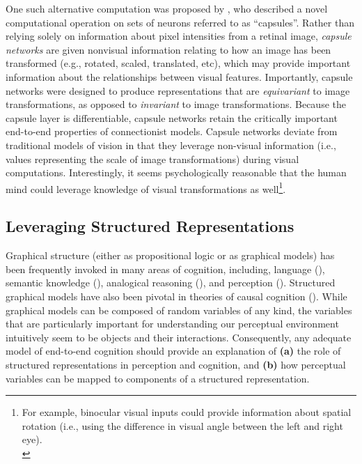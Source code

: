 \documentclass[12pt]{article}
\let\oldcite=\cite
\let\oldtextcite=\textcite
\renewcommand{\cite}[1]{\textcolor[rgb]{0, .121, .388}{\oldcite{#1}}}
\renewcommand{\textcite}[1]{\textcolor[rgb]{0, .121, .388}{\oldtextcite{#1}}}
\begin{document}
One such alternative computation was proposed by \textcite{hinton2011transforming}, who described a novel computational operation on sets of neurons referred to as ``capsules''. Rather than relying solely on information about pixel intensities from a retinal image, \emph{capsule networks} are given nonvisual information relating to how an image has been transformed (e.g., rotated, scaled, translated, etc), which may provide important information about the relationships between visual features. Importantly, capsule networks were designed to produce representations that are \emph{equivariant} to image transformations, as opposed to \emph{invariant} to image transformations. Because the capsule layer is differentiable, capsule networks retain the critically important end-to-end properties of connectionist models. Capsule networks deviate from traditional models of vision in that they leverage non-visual information (i.e., values representing the scale of image transformations) during visual computations. Interestingly, it seems psychologically reasonable that the human mind could leverage knowledge of visual transformations as well\footnote{For example, binocular visual inputs could provide information about spatial rotation (i.e., using the difference in visual angle between the left and right eye). \\}.


\subsection{Leveraging Structured Representations}

Graphical structure (either as propositional logic or as graphical models) has been frequently invoked in many areas of cognition, including, language (\cite{vitevitch2008can}), semantic knowledge (\cite{quillian1967word,collins1975spreading}), analogical reasoning (\cite{gentner1983structure}), and perception (\cite{pylyshyn1973mind,biederman1987recognition,hummel1992dynamic}). Structured graphical models have also been pivotal in theories of causal cognition (\cite{danks2014unifying}). While graphical models can be composed of random variables of any kind, the variables that are particularly important for understanding our perceptual environment intuitively seem to be objects and their interactions. Consequently, any adequate model of end-to-end cognition should provide an explanation of \textbf{(a)} the role of structured representations in perception and cognition, and \textbf{(b)} how perceptual variables can be mapped to components of a structured representation.  
\end{document}
